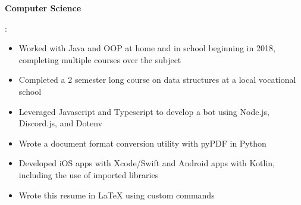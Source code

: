 \documentclass[letterpaper,11pt]{article}
\newcommand{\resumeItem}[2]{
  \item\small{
    \textbf{#1}{: #2 \vspace{-2pt}}
  }
}
\begin{document}
 \resumeItem{Computer Science}
 {
 \begin{itemize}
   \item Worked with Java and OOP at home and in school beginning in 2018, completing multiple courses over the subject
   \item Completed a 2 semester long course on data structures at a local vocational school
   \item Leveraged Javascript and Typescript to develop a bot using Node.js, Discord.js, and Dotenv
   \item Wrote a document format conversion utility with pyPDF in Python 
   \item Developed iOS apps with Xcode/Swift and Android apps with Kotlin, including the use of imported libraries
   \item Wrote this resume in LaTeX using custom commands
 \end{itemize}
 }
\end{document}
